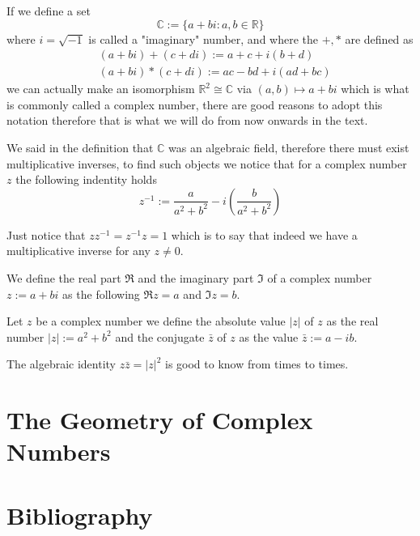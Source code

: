 \documentclass{article}
\begin{document}
\begin{remark}
    If we define a set
    $$
    \mathbb{C} := \{ a+bi : a,b \in \mathbb{R}\}
    $$
    where $i = \sqrt{-1}$ is called a "imaginary" number, and where the $+,*$ are defined as
    \begin{align*}
        & (a+bi) + (c+di) := a+c + i(b+d) \\
        & (a+bi)*(c+di) := ac-bd + i (ad + bc)
    \end{align*}
    we can actually make an isomorphism $\mathbb{R}^2 \cong \mathbb{C}$ via $(a,b) \mapsto a+bi$
    which is what is commonly called a complex number, there are good reasons to adopt this
    notation therefore that is what we will do from now onwards in the text.
\end{remark}

We said in the definition that  $\mathbb{C}$ was an algebraic field, therefore there must
exist multiplicative inverses, to find such objects we notice that for a complex number $z$
the following indentity holds 
$$
z^{-1} := \frac{a}{a^2 + b^2} - i (\frac{b}{a^2 + b^2})
$$

Just notice that $zz^{-1}=z^{-1}z = 1$ which is to say that indeed
we have a multiplicative inverse for any $z \ne 0$.

\begin{remark}
    We define the real part $\Re$ and the imaginary part $\Im$ of a complex number $z:=a+bi$ as
    the following $\Re z = a$ and $\Im z = b$.
\end{remark}

\begin{definition}
    Let $z$ be a complex number we define the absolute value $|z|$ of $z$ as the real number
    $|z|:= a^2 + b^2$ and the conjugate $\bar{z}$ of $z$ as the value $\bar{z}:= a-ib$.
\end{definition}

\begin{remark}
    The algebraic identity $z\bar{z}= |z|^2$ is good to know from times to times.
\end{remark}


\section{The Geometry of Complex Numbers}

\newpage
\section*{Bibliography}
\printbibliography
\end{document}

